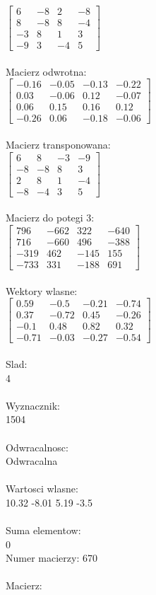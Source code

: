 \documentclass[a4paper,12pt]{article}
\begin{document}
$\begin{bmatrix} 6&-8&2&-8\\8&-8&8&-4\\-3&8&1&3\\-9&3&-4&5 \end{bmatrix}$
\\
\\
Macierz odwrotna:\\

$\begin{bmatrix} -0.16&-0.05&-0.13&-0.22\\0.03&-0.06&0.12&-0.07\\0.06&0.15&0.16&0.12\\-0.26&0.06&-0.18&-0.06 \end{bmatrix}$
\\
\\
Macierz transponowana:\\

$\begin{bmatrix} 6&8&-3&-9\\-8&-8&8&3\\2&8&1&-4\\-8&-4&3&5 \end{bmatrix}$
\\
\\
Macierz do potegi 3:\\

$\begin{bmatrix} 796&-662&322&-640\\716&-660&496&-388\\-319&462&-145&155\\-733&331&-188&691 \end{bmatrix}$
\\
\\
Wektory wlasne:\\

$\begin{bmatrix} 0.59&-0.5&-0.21&-0.74\\0.37&-0.72&0.45&-0.26\\-0.1&0.48&0.82&0.32\\-0.71&-0.03&-0.27&-0.54 \end{bmatrix}$
\\
\\
Slad:\\
4
\\
\\
Wyznacznik:\\
1504
\\
\\
Odwracalnosc:\\
Odwracalna
\\
\\
Wartosci wlasne:\\
10.32 -8.01 5.19 -3.5
\\
\\
Suma elementow:\\
0
\\
\newpage
Numer macierzy:
670
\\
\\
Macierz:\\
\end{document}
